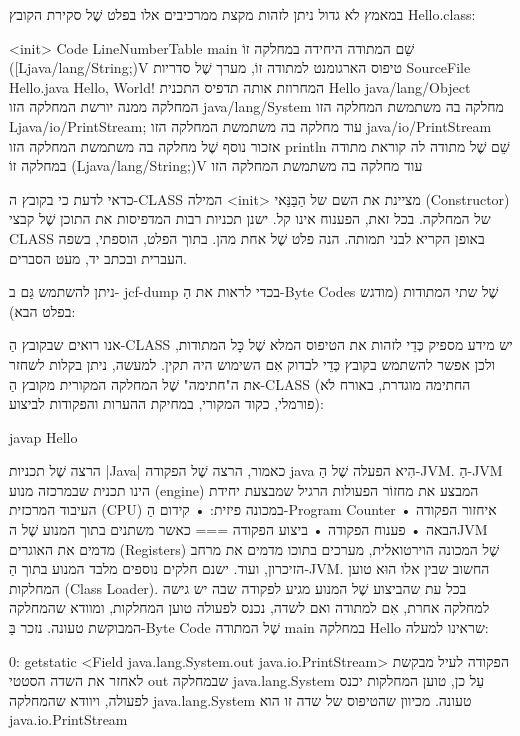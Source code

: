 במאמץ לֹא גדול ניתן לזהות מקצת ממרכיבים אלו בפלט שֶׁל סקירת הקובץ
Hello.class:

<init>
Code
LineNumberTable
main שֵׁם המתודה היחידה במחלקה זוֹ
([Ljava/lang/String;)V טיפוס הארגומנט למתודה זוֹ, מערך שֶׁל
סדריות
SourceFile
Hello.java
Hello, World! המחרוזת אותה תדפיס התכנית
Hello
java/lang/Object המחלקה ממנה יורשת
המחלקה הזו
java/lang/System מחלקה בה משתמשת המחלקה
הזו
Ljava/io/PrintStream; עוד מחלקה בה משתמשת המחלקה
הזו
java/io/PrintStream אזכור נוסף שֶׁל מחלקה בה משתמשת
המחלקה הזו
println שֵׁם שֶׁל מתודה לה קוראת מתודה במחלקה זוֹ
(Ljava/lang/String;)V עוד מחלקה בה משתמשת המחלקה
הזו

כדאי לדעת כי בקובץ ה-CLASS המילה <init> מציינת את השם של הַבַּנַּאי
(Constructor) של המחלקה.
בכל זאת, הפענוח אינו קל. ישנן תכניות רבות המדפיסות את התוכן שֶׁל קבצי
CLASS באופן הקריא לבני תמותה. הנה פלט שֶׁל אחת מהן. בתוך הפלט, הוספתי, בשפה
העברית ובכתב יד, מעט הסברים.

ניתן להשתמש גַּם ב- jcf-dump בכדי לראות את הַ-Byte Codes שֶׁל שתי המתודות
(מודגש בפלט הבא):


אנו רואים שבקובץ הַ-CLASS יש מידע מספיק כְּדֵי לזהות את הטיפוס המלא שֶׁל כָּל
המתודות, ולכן אפשר להשתמש בקובץ כְּדֵי לבדוק אִם השימוש היה תקין. למעשה, ניתן
בקלות לשחזר את ה"חתימה" שֶׁל המחלקה המקורית מקובץ הַ-CLASS (החתימה
מוגדרת, באורח לֹא פורמלי, כקוד המקורי, במחיקת ההערות והפקודות לביצוע):

javap Hello
\END

הרצה שֶׁל תכניות \E|Java|
כאמור, הרצה שֶׁל הפקודה java הִיא הפעלה שֶׁל הַ-JVM. הַ-JVM הינו
תכנית שבמרכזה מנוע (engine) המבצע את מחזוֹר הפעולות הרגיל שמבצעת יחידת
העיבוד המרכזית (CPU) במכונה פיזית:
• קידום הַ-Program Counter
• איחזור הפקודה הבאה
• פענוח הפקודה
• ביצוע הפקודה
===
כאשר משתנים בתוך המנוע שֶׁל הJVM מדמים את האוגרים (Registers) שֶׁל המכונה
הוירטואלית, מערכים בתוכו מדמים את מרחב הזיכרון, ועוד.
ישנם חלקים נוספים מלבד המנוע בתוך הַ-JVM. החשוב שבין אלו הוּא טוען המחלקות
(Class Loader). בכל עת שהביצוע שֶׁל המנוע מגיע לפקודה שבה יש גישה למחלקה
אחרת, אִם למתודה ואם לשדה, נכנס לפעולה טוען המחלקות, ומוודא שהמחלקה
המבוקשת טעונה.
נזכר בַּ-Byte Code שֶׁל המתודה main במחלקה Hello שראינו למעלה:

  0: getstatic <Field java.lang.System.out java.io.PrintStream>
הפקודה לעיל מבקשת לאחזר את השדה הסטטי out שבמחלקה java.lang.System עַל כן,
טוען המחלקות יכנס לפעולה, ויוודא שהמחלקה java.lang.System טעונה. מכיוון
שהטיפוס של שדה זו הוא java.io.PrintStream


